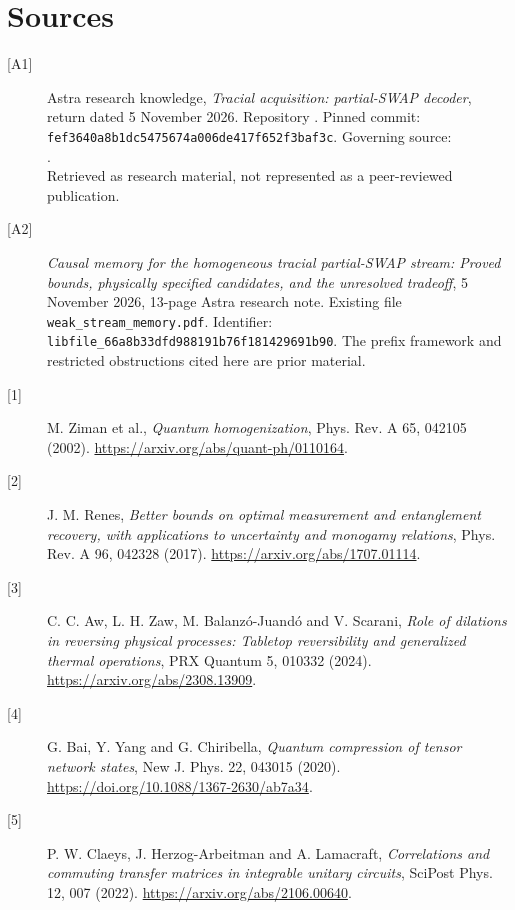 \documentclass[11pt,a4paper]{article}
\begin{document}
\section*{Sources}
\small
\begin{description}
\item[{[A1]}] Astra research knowledge, \emph{Tracial acquisition: partial-SWAP decoder}, return dated 5 November 2026. Repository . Pinned commit:\\ \texttt{fef3640a8b1dc5475674a006de417f652f3baf3c}. Governing source:\\ {\footnotesize{}}.\\ Retrieved as research material, not represented as a peer-reviewed publication.
\item[{[A2]}] \emph{Causal memory for the homogeneous tracial partial-SWAP stream: Proved bounds, physically specified candidates, and the unresolved tradeoff}, 5 November 2026, 13-page Astra research note. Existing file \texttt{weak\_stream\_memory.pdf}. Identifier:\\ \texttt{libfile\_66a8b33dfd988191b76f181429691b90}. The prefix framework and restricted obstructions cited here are prior material.
\item[{[1]}] M. Ziman et al., \emph{Quantum homogenization}, Phys. Rev. A 65, 042105 (2002). \url{https://arxiv.org/abs/quant-ph/0110164}.
\item[{[2]}] J. M. Renes, \emph{Better bounds on optimal measurement and entanglement recovery, with applications to uncertainty and monogamy relations}, Phys. Rev. A 96, 042328 (2017). \url{https://arxiv.org/abs/1707.01114}.
\item[{[3]}] C. C. Aw, L. H. Zaw, M. Balanz\'o-Juand\'o and V. Scarani, \emph{Role of dilations in reversing physical processes: Tabletop reversibility and generalized thermal operations}, PRX Quantum 5, 010332 (2024). \url{https://arxiv.org/abs/2308.13909}.
\item[{[4]}] G. Bai, Y. Yang and G. Chiribella, \emph{Quantum compression of tensor network states}, New J. Phys. 22, 043015 (2020). \url{https://doi.org/10.1088/1367-2630/ab7a34}.
\item[{[5]}] P. W. Claeys, J. Herzog-Arbeitman and A. Lamacraft, \emph{Correlations and commuting transfer matrices in integrable unitary circuits}, SciPost Phys. 12, 007 (2022). \url{https://arxiv.org/abs/2106.00640}.
\end{description}
\end{document}
